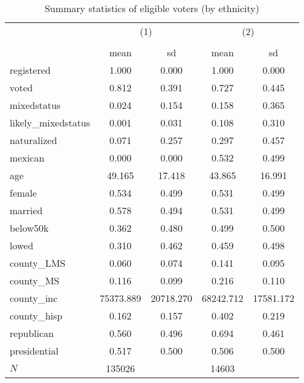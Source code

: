 \begin{table}[htbp]\centering
\def\sym#1{\ifmmode^{#1}\else\(^{#1}\)\fi}
\caption{Summary statistics of eligible voters (by ethnicity)}
\begin{tabular}{l*{2}{cc}}
\hline\hline
            &\multicolumn{2}{c}{(1)}  &\multicolumn{2}{c}{(2)}  \\
            &\multicolumn{2}{c}{}     &\multicolumn{2}{c}{}     \\
            &        mean&          sd&        mean&          sd\\
\hline
registered  &       1.000&       0.000&       1.000&       0.000\\
voted       &       0.812&       0.391&       0.727&       0.445\\
mixedstatus &       0.024&       0.154&       0.158&       0.365\\
likely\_mixedstatus&       0.001&       0.031&       0.108&       0.310\\
naturalized &       0.071&       0.257&       0.297&       0.457\\
mexican     &       0.000&       0.000&       0.532&       0.499\\
age         &      49.165&      17.418&      43.865&      16.991\\
female      &       0.534&       0.499&       0.531&       0.499\\
married     &       0.578&       0.494&       0.531&       0.499\\
below50k    &       0.362&       0.480&       0.499&       0.500\\
lowed       &       0.310&       0.462&       0.459&       0.498\\
county\_LMS  &       0.060&       0.074&       0.141&       0.095\\
county\_MS   &       0.116&       0.099&       0.216&       0.110\\
county\_inc  &   75373.889&   20718.270&   68242.712&   17581.172\\
county\_hisp &       0.162&       0.157&       0.402&       0.219\\
republican  &       0.560&       0.496&       0.694&       0.461\\
presidential&       0.517&       0.500&       0.506&       0.500\\
\hline
\(N\)       &      135026&            &       14603&            \\
\hline\hline
\end{tabular}
\end{table}
